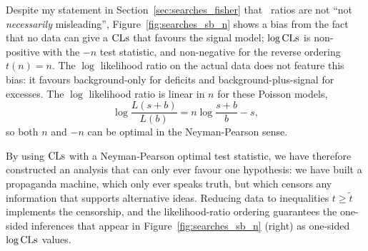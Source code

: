Despite my statement in Section~\ref{sec:searches_fisher} that \pvalue\
ratios are not ``not \emph{necessarily} misleading'',
Figure~\ref{fig:searches_sb_n} shows a bias from the fact that
no data can give a $\mathrm{CLs}$ that favours the signal model;
$\log\mathrm{CLs}$ is non-positive with the $-n$ test statistic, and non-negative
for the reverse ordering $t(n) = n$.
The $\log$ likelihood ratio on the actual data does not feature this bias:
it favours background-only for deficits and background-plus-signal for
excesses.
The $\log$ likelihood ratio is linear in $n$ for these Poisson models,
\begin{equation}
\log \frac{L(s + b)}{L(b)}
= n\log\frac{s + b}{b} - s
,
\end{equation}
so both $n$ and $-n$ can be optimal in the Neyman-Pearson sense.

By using $\mathrm{CLs}$ with a Neyman-Pearson optimal test statistic, we have therefore
constructed an analysis that can only ever favour one hypothesis:
we have built a propaganda machine, which only ever speaks truth,
but which censors any information that supports alternative ideas.
Reducing data to inequalities $t \geq \tilde{t}$ implements the censorship,
and the likelihood-ratio ordering guarantees the one-sided inferences
that appear in Figure~\ref{fig:searches_sb_n} (right) as one-sided
$\log\mathrm{CLs}$ values.

